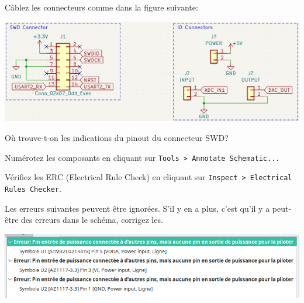 \documentclass[12pt,%
addpoints,%
]{exam}
\begin{document}
\begin{questions}
	\newpage
	\question Câblez les connecteurs comme dans la figure suivante:
	\begin{center}
        \includegraphics[scale=0.4]{figures/kicad10.png}
    \end{center}
	\question Où trouve-t-on les indications du pinout du connecteur SWD?

	\question Numérotez les composants en cliquant sur \texttt{Tools > Annotate Schematic...}

	\question Vérifiez les ERC (Electrical Rule Check) en cliquant sur \texttt{Inspect > Electrical Rules Checker}.
		
		Les erreurs suivantes peuvent être ignorées. S'il y en a plus, c'est qu'il y a peut-être des erreurs dans le schéma, corrigez les.
	\begin{center}
        \includegraphics[width=\linewidth]{figures/kicad13.png}
    \end{center}
\end{questions}

\newpage
\end{document}
